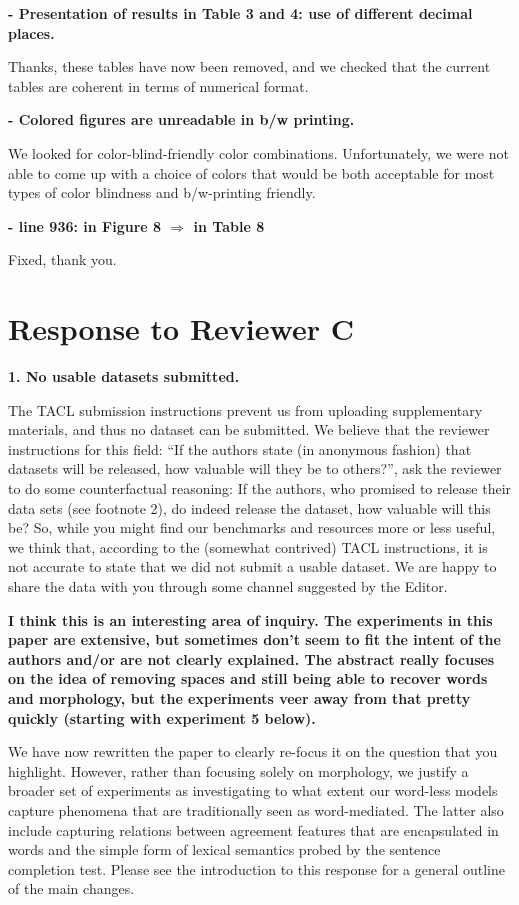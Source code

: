 \documentclass{article}[11pt,a4paper,oneside]
\begin{document}
\textbf{- Presentation of results in Table 3 and 4: use of different decimal places.}

Thanks, these tables have now been removed, and we checked that the current tables are coherent in terms of numerical format.
\newline

\textbf{- Colored figures are unreadable in b/w printing.}

We looked for color-blind-friendly color combinations. Unfortunately, we were not able to come up with a choice of colors that would be both acceptable for most types of color blindness and b/w-printing friendly.
\newline


\textbf{- line 936: in Figure 8 $\Rightarrow$ in Table 8}

Fixed, thank you.


\section{Response to Reviewer C}

\textbf{1. No usable datasets submitted.}

The TACL submission instructions prevent us from uploading supplementary materials, and thus no dataset can be submitted. We believe that the reviewer instructions for this field: ``If the authors state (in anonymous fashion) that datasets will be released, how valuable will they be to others?'', ask the reviewer to do some counterfactual reasoning: If the authors, who promised to release their data sets (see footnote 2), do indeed release the dataset, how valuable will this be? So, while you might find our benchmarks and resources more or less useful, we think that, according to the (somewhat contrived) TACL instructions, it is not accurate to state that we did not submit a usable dataset. We are happy to share the data with you through some channel suggested by the Editor.
\newline

\textbf{I think this is an interesting area of inquiry.  The experiments in this paper are extensive, but sometimes don't seem to fit the intent of the authors and/or are not clearly explained.  The abstract really focuses on the idea of removing spaces and still being able to recover words and morphology, but the experiments veer away from that pretty quickly (starting with experiment 5 below).}

We have now rewritten the paper to clearly re-focus it on the question that you highlight. However, rather than focusing solely on morphology, we justify a broader set of experiments as investigating to what extent our word-less models capture phenomena that are traditionally seen as word-mediated. The latter also include capturing relations between agreement features that are encapsulated in words and the simple form of lexical semantics probed by the sentence completion test. Please see the introduction to this response for a general outline of the main changes.
\newline
\end{document}
